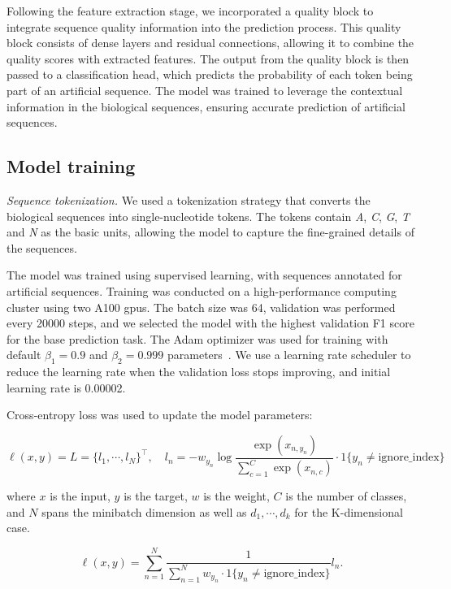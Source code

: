 \documentclass[pdflatex, sn-mathphys-num, lineno]{sn-jnl}%
\theoremstyle{thmstyleone}%
\theoremstyle{thmstyletwo}%
\theoremstyle{thmstylethree}%
\begin{document}
Following the feature extraction stage, we incorporated a quality block to integrate sequence quality information into the prediction process.
This quality block consists of dense layers and residual connections, allowing it to combine the quality scores with extracted features.
The output from the quality block is then passed to a classification head, which predicts the probability of each token being part of an artificial sequence.
The model was trained to leverage the contextual information in the biological sequences, ensuring accurate prediction of artificial sequences.


\subsection{Model training}\label{ssec:training}

\textit{Sequence tokenization.} We used a tokenization strategy that converts the biological sequences into single-nucleotide tokens.
The tokens contain \emph{A}, \emph{C}, \emph{G}, \emph{T} and \emph{N} as the basic units, allowing the model to capture the fine-grained details of the sequences.

The model was trained using supervised learning, with sequences annotated for artificial sequences.
Training was conducted on a high-performance computing cluster using two A100 \glspl{gpu}.
The batch size was \num{64}, validation was performed every \num{20000} steps, and we selected the model with the highest validation F1 score for the base prediction task.
The Adam optimizer was used for training with default \( \beta_{1} = 0.9 \) and \( \beta_{2} = 0.999 \) parameters~\cite{kingma2014adam}.
We use a learning rate scheduler to reduce the learning rate when the validation loss stops improving, and initial learning rate is \num{0.00002}.

Cross-entropy loss was used to update the model parameters:


\[
	\ell(x, y) = L = \{l_1,\cdots,l_N\}^\top, \quad
	l_n = - w_{y_n} \log \frac{\exp(x_{n,y_n})}{\sum_{c=1}^C \exp(x_{n,c})}
	\cdot 1\{y_n \not= \textrm{ignore\_index}\}
\]

where \( x \) is the input, \( y \) is the target, \( w \) is the weight,
\( C \) is the number of classes, and \( N \) spans the minibatch dimension as well as
\( d_1, \cdots, d_k \) for the K-dimensional case.

\[
	\ell(x, y) =   \sum_{n=1}^N \frac{1}{\sum_{n=1}^N w_{y_n} \cdot 1\{y_n \not= \textrm{ignore\_index}\}} l_n
	.\]
\end{document}

